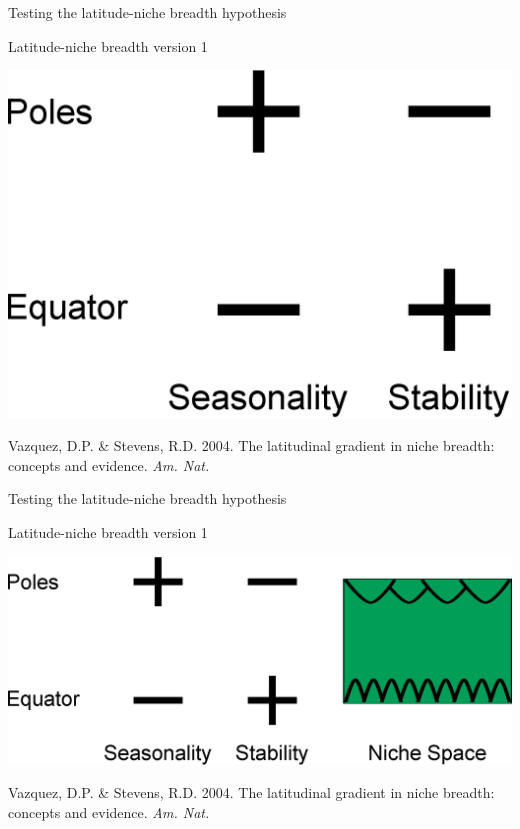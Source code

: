 \documentclass{beamer}
\begin{document}
  \begin{frame}{Testing the latitude-niche breadth hypothesis}

    \begin{block}{Latitude-niche breadth version 1}
    \begin{center}
      \includegraphics[width=.8\textwidth]{Figures/latitude_niche_breadth_2.eps}
    \end{center}

    \vspace{1cm}

    \tiny{Vazquez, D.P. \& Stevens, R.D. 2004. The latitudinal gradient in niche breadth: concepts and evidence. \emph{Am. Nat.}}
    \end{block}
  \end{frame}


  \begin{frame}{Testing the latitude-niche breadth hypothesis}

    \begin{block}{Latitude-niche breadth version 1}
    \begin{center}
      \includegraphics[width=.8\textwidth]{Figures/latitude_niche_breadth_3.eps}
    \end{center}

    \vspace{1cm}

    \tiny{Vazquez, D.P. \& Stevens, R.D. 2004. The latitudinal gradient in niche breadth: concepts and evidence. \emph{Am. Nat.}}
    \end{block}
  \end{frame}
\end{document}
